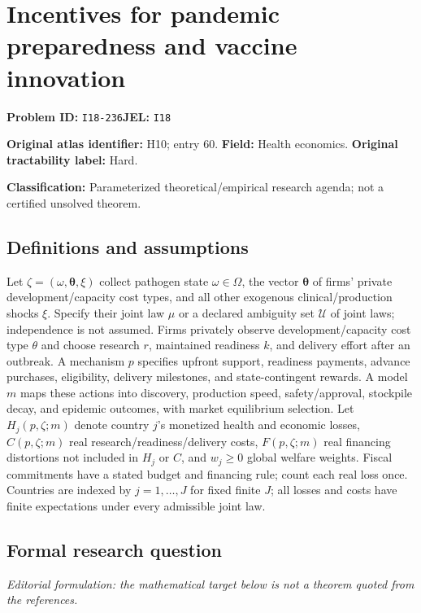 \documentclass[11pt,a4paper]{article}
\begin{document}
\section*{Incentives for pandemic preparedness and vaccine innovation}
\textbf{Problem ID:} \texttt{I18-236}\quad \textbf{JEL:} \texttt{I18}\par
\label{problem:OP-0060}
\label{atlas:prob:H10}
\noindent\textbf{Original atlas identifier:} H10; entry 60. \textbf{Field:} Health economics. \textbf{Original tractability label:} Hard.

\noindent\textbf{Classification:} Parameterized theoretical/empirical research agenda; not a certified unsolved theorem.

\subsection*{Definitions and assumptions}
Let $\zeta=(\omega,\boldsymbol\theta,\xi)$ collect pathogen state $\omega\in\Omega$, the vector $\boldsymbol\theta$ of firms' private development/capacity cost types, and all other exogenous clinical/production shocks $\xi$. Specify their joint law $\mu$ or a declared ambiguity set $\mathcal U$ of joint laws; independence is not assumed. Firms privately observe development/capacity cost type $\theta$ and choose research $r$, maintained readiness $k$, and delivery effort after an outbreak. A mechanism $p$ specifies upfront support, readiness payments, advance purchases, eligibility, delivery milestones, and state-contingent rewards. A model $m$ maps these actions into discovery, production speed, safety/approval, stockpile decay, and epidemic outcomes, with market equilibrium selection. Let $H_j(p,\zeta;m)$ denote country $j$'s monetized health and economic losses, $C(p,\zeta;m)$ real research/readiness/delivery costs, $F(p,\zeta;m)$ real financing distortions not included in $H_j$ or $C$, and $w_j\geq0$ global welfare weights. Fiscal commitments have a stated budget and financing rule; count each real loss once. Countries are indexed by $j=1,\ldots,J$ for fixed finite $J$; all losses and costs have finite expectations under every admissible joint law.

\subsection*{Formal research question}
\emph{Editorial formulation: the mathematical target below is not a theorem quoted from the references.}
\end{document}
